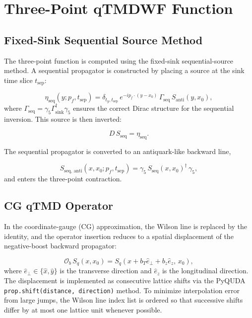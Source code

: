 \documentclass[11pt]{article}
\begin{document}
\section{Three-Point qTMDWF Function}
\label{sec:threept}

\subsection{Fixed-Sink Sequential Source Method}

The three-point function is computed using the fixed-sink sequential-source method. A sequential propagator is constructed by placing a source at the sink time slice $t_{\text{sep}}$:

\begin{equation}
    \eta_{\text{seq}}(y; p_f, t_{\text{sep}}) = \delta_{t_y, t_{\text{sep}}} \, e^{-i p_f \cdot (y - x_0)} \, \Gamma_{\text{seq}} \, S_{\text{anti}}(y, x_0),
\end{equation}
where $\Gamma_{\text{seq}} = \gamma_5 \Gamma_{\text{sink}}^\dagger \gamma_5$ ensures the correct Dirac structure for the sequential inversion. This source is then inverted:

\begin{equation}
    D \, S_{\text{seq}} = \eta_{\text{seq}}.
\end{equation}

The sequential propagator is converted to an antiquark-like backward line,

\begin{equation}
    S_{\text{seq, anti}}(x, x_0; p_f, t_{\text{sep}}) = \gamma_5 \, S_{\text{seq}}(x, x_0)^\dagger \, \gamma_5,
\end{equation}
and enters the three-point contraction.

\subsection{CG qTMD Operator}

In the coordinate-gauge (CG) approximation, the Wilson line is replaced by the identity, and the operator insertion reduces to a spatial displacement of the negative-boost backward propagator:

\begin{equation}
    \mathcal{O}_b \, S_q(x, x_0) = S_q\left(x + b_T \hat{e}_{\perp} + b_z \hat{e}_z, \, x_0\right),
\end{equation}
where $\hat{e}_{\perp} \in \{\hat{x}, \hat{y}\}$ is the transverse direction and $\hat{e}_z$ is the longitudinal direction. The displacement is implemented as consecutive lattice shifts via the PyQUDA \texttt{prop.shift(distance, direction)} method. To minimize interpolation error from large jumps, the Wilson line index list is ordered so that successive shifts differ by at most one lattice unit whenever possible.
\end{document}
